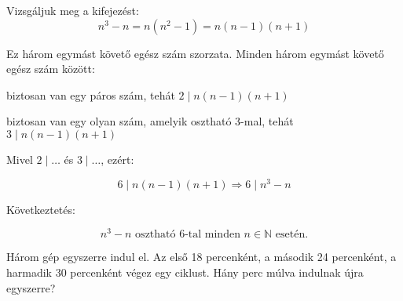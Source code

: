 \begin{solution}
Vizsgáljuk meg a kifejezést: 
\[
n^{3}-n=n(n^{2}-1)=n(n-1)(n+1)
\]

Ez három egymást követő egész szám szorzata. Minden három egymást
követő egész szám között:

biztosan van egy páros szám, tehát $2\mid n(n-1)(n+1)$

biztosan van egy olyan szám, amelyik osztható 3-mal, tehát $3\mid n(n-1)(n+1)$

Mivel $2\mid\ldots$ és $3\mid\ldots$, ezért:

\[
6\mid n(n-1)(n+1)\Rightarrow\boxed{6\mid n^{3}-n}
\]

Következtetés:

\[
\boxed{n^{3}-n\text{ osztható 6-tal minden }n\in\mathbb{N}\text{ esetén.}}
\]
\end{solution}
\begin{extraproblem}
 Három gép egyszerre indul el. Az első 18 percenként, a második 24
percenként, a harmadik 30 percenként végez egy ciklust. Hány perc
múlva indulnak újra egyszerre?
\end{extraproblem}

